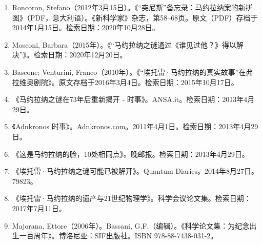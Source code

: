 \begin{enumerate}
\item Roncoron, Stefano（2012年3月15日）。《“突尼斯”备忘录：马约拉纳案的新拼图》（PDF，意大利语）。《新科学家》杂志，第58–68页。原文（PDF）存档于2014年1月15日。检索日期：2020年10月28日。
\item Mosconi, Barbara（2015年）。《“马约拉纳之谜通过《谁见过他？》得以解决”》。检索日期：2020年12月20日。
\item Bascone; Venturini, Franco（2010年）。《“埃托雷·马约拉纳的真实故事”在弗拉维奥剧院》。原文存档于2016年3月4日。检索日期：2015年10月17日。
\item 《马约拉纳之谜在73年后重新揭开 - 时事》。ANSA.it。检索日期：2013年4月29日。
\item 《Adnkronos 时事》。Adnkronos.com。2011年4月1日。检索日期：2013年4月29日。
\item 《这是马约拉纳的脸，10处相同点》。晚邮报。检索日期：2013年4月29日。
\item 《埃托雷·马约拉纳之谜可能已被解开》。Quantum Diaries。2014年8月27日。79823。
\item 《埃托雷·马约拉纳的遗产与21世纪物理学》。科学会议论文集。检索日期：2017年7月11日。
\item Majorana, Ettore（2006年）。Bassani, G.F.（编辑）。《科学论文集：为纪念出生一百周年》。博洛尼亚：SIF出版社。ISBN 978-88-7438-031-2。
\end{enumerate}

